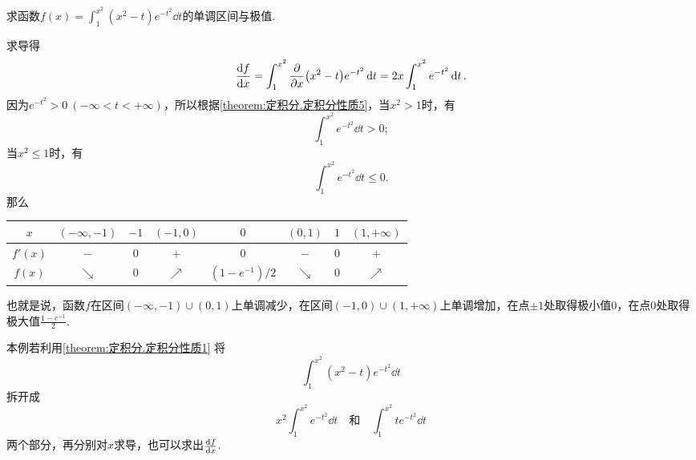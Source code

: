 \begin{example}
求函数\(f(x) = \int_1^{x^2} (x^2-t) e^{-t^2} \dd{t}\)的单调区间与极值.
\begin{solution}
求导得\[
\dv{f}{x}
= \int_1^{x^2} \pdv{x} (x^2-t) e^{-t^2} \dd{t}
= 2x \int_1^{x^2} e^{-t^2} \dd{t}.
\]
因为\(e^{-t^2}>0\ (-\infty<t<+\infty)\)，所以根据\cref{theorem:定积分.定积分性质5}，当\(x^2>1\)时，有\[
\int_1^{x^2} e^{-t^2} \dd{t} > 0;
\]当\(x^2 \leq 1\)时，有\[
\int_1^{x^2} e^{-t^2} \dd{t} \leq 0.
\]那么\begin{center}
\begin{tabular}{c|*7c}
\hline
\(x\) & \((-\infty,-1)\) & \(-1\) & \((-1,0)\) & \(0\) & \((0,1)\) & \(1\) & \((1,+\infty)\) \\ \hline
\(f'(x)\) & \(-\) & \(0\) & \(+\) & \(0\) & \(-\) & \(0\) & \(+\) \\
\(f(x)\) & \(\searrow\) & \(0\) & \(\nearrow\) & \((1-e^{-1})/2\) & \(\searrow\) & \(0\) & \(\nearrow\) \\
\hline
\end{tabular}
\end{center}
也就是说，函数\(f\)在区间\((-\infty,-1)\cup(0,1)\)上单调减少，在区间\((-1,0)\cup(1,+\infty)\)上单调增加，在点\(\pm1\)处取得极小值\(0\)，在点\(0\)处取得极大值\(\frac{1-e^{-1}}{2}\).
\end{solution}
\end{example}
本例若利用\cref{theorem:定积分.定积分性质1} 将\[
\int_1^{x^2} (x^2-t) e^{-t^2} \dd{t}
\]拆开成\[
x^2 \int_1^{x^2} e^{-t^2} \dd{t}
\quad\text{和}\quad
\int_1^{x^2} t e^{-t^2} \dd{t}
\]两个部分，再分别对\(x\)求导，也可以求出\(\dv{f}{x}\).

